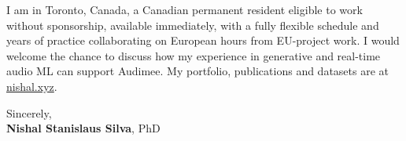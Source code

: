 \documentclass[11pt]{article}
\newcommand{\clName}{Nishal Stanislaus Silva}
\newcommand{\clCompany}{Audimee}
\begin{document}
I am in Toronto, Canada, a Canadian permanent resident eligible to work without sponsorship, available immediately, with a fully flexible schedule and years of practice collaborating on European hours from EU-project work. I would welcome the chance to discuss how my experience in generative and real-time audio ML can support \clCompany{}. My portfolio, publications and datasets are at \href{https://nishal.xyz}{nishal.xyz}.

\vspace{12pt}
Sincerely,\\[2pt]
\textbf{\clName}, PhD
\end{document}
